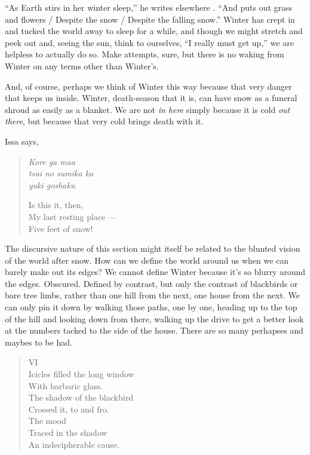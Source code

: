 \documentclass[12pt,oneside]{memoir}
\begin{document}
``As Earth stirs in her winter sleep,'' he writes elsewhere \parencite[173]{graves_poems}. ``And puts out grass and flowers / Despite the snow / Despite the falling snow.'' Winter has crept in and tucked the world away to sleep for a while, and though we might stretch and peek out and, seeing the sun, think to ourselves, ``I really must get up,'' we are helpless to actually do so. Make attempts, sure, but there is no waking from Winter on any terms other than Winter's.

And, of course, perhaps we think of Winter this way because that very danger that keeps us inside. Winter, death-season that it is, can have snow as a funeral shroud as easily as a blanket. We are not \emph{in here} simply because it is cold \emph{out there}, but because that very cold brings death with it.

Issa says,

\begin{verse}
\emph{Kore ga maa} \\
\emph{tsui no sumika ka} \\
\emph{yuki goshaku}

Is this it, then, \\
My last resting place --- \\
Five feet of snow!

\parencite[37]{issa}
\end{verse}

The discursive nature of this section might itself be related to the blunted vision of the world after snow. How can we define the world around us when we can barely make out its edges? We cannot define Winter because it's so blurry around the edges. Obscured. Defined by contrast, but only the contrast of blackbirds or bare tree limbs, rather than one hill from the next, one house from the next. We can only pin it down by walking those paths, one by one, heading up to the top of the hill and looking down from there, walking up the drive to get a better look at the numbers tacked to the side of the house. There are so many perhapses and maybes to be had.

\begin{verse}

VI \\
Icicles filled the long window \\
With barbaric glass. \\
The shadow of the blackbird \\
Crossed it, to and fro. \\
The mood \\
Traced in the shadow \\
An indecipherable cause.

\parencite{blackbird}
\end{verse}
\end{document}
